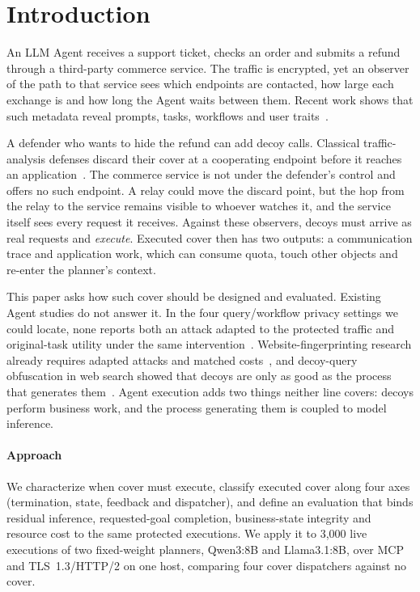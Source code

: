 \section{Introduction}\label{sec:intro}
An LLM Agent receives a support ticket, checks an order and submits a refund through a third-party commerce service. The traffic is encrypted, yet an observer of the path to that service sees which endpoints are contacted, how large each exchange is and how long the Agent waits between them. Recent work shows that such metadata reveal prompts, tasks, workflows and user traits~\cite{jeong2026wra,dangol2026workflow,pouryousef2026traffic,li2026ant}.

A defender who wants to hide the refund can add decoy calls. Classical traffic-analysis defenses discard their cover at a cooperating endpoint before it reaches an application~\cite{apthorpe2019stp}. The commerce service is not under the defender's control and offers no such endpoint. A relay could move the discard point, but the hop from the relay to the service remains visible to whoever watches it, and the service itself sees every request it receives. Against these observers, decoys must arrive as real requests and \emph{execute}. Executed cover then has two outputs: a communication trace and application work, which can consume quota, touch other objects and re-enter the planner's context.

This paper asks how such cover should be designed and evaluated. Existing Agent studies do not answer it. In the four query/workflow privacy settings we could locate, none reports both an attack adapted to the protected traffic and original-task utility under the same intervention~\cite{jeong2026wra,dangol2026workflow}. Website-fingerprinting research already requires adapted attacks and matched costs~\cite{juarez2014critical,mathews2023critical}, and decoy-query obfuscation in web search showed that decoys are only as good as the process that generates them~\cite{howe2008trackmenot,peddinti2010trackmenot,balsa2012obpws}. Agent execution adds two things neither line covers: decoys perform business work, and the process generating them is coupled to model inference.



\paragraph{Approach}
We characterize when cover must execute, classify executed cover along four axes (termination, state, feedback and dispatcher), and define an evaluation that binds residual inference, requested-goal completion, business-state integrity and resource cost to the same protected executions. We apply it to 3,000 live executions of two fixed-weight planners, Qwen3:8B and Llama3.1:8B, over MCP and TLS~1.3/HTTP/2 on one host, comparing four cover dispatchers against no cover.

